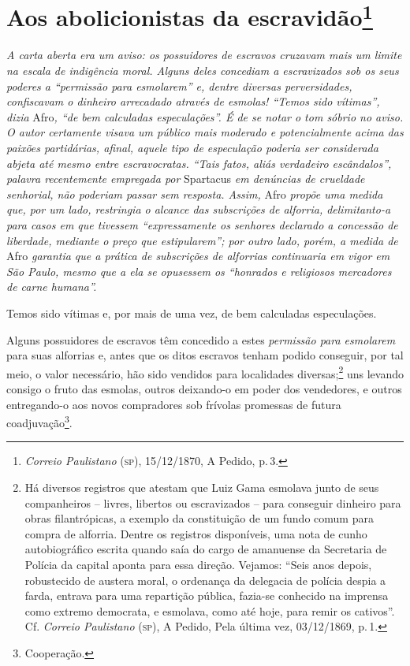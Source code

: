 \chapter{Aos abolicionistas da escravidão\footnote{\emph{Correio Paulistano} (\textsc{sp}), 15/12/1870, A Pedido,
  p.\,3.}} %

\begin{didascalia}
\emph{A carta aberta era um aviso: os possuidores de escravos cruzavam
mais um limite na escala de indigência moral. Alguns deles concediam a
escravizados sob os seus poderes a ``permissão para esmolarem'' e, dentre
diversas perversidades, confiscavam o dinheiro arrecadado através de
esmolas! ``Temos sido vítimas'', dizia} Afro\emph{, ``de bem calculadas
especulações''. É de se notar o tom sóbrio no aviso. O autor certamente
visava um público mais moderado e potencialmente acima das paixões
partidárias, afinal, aquele tipo de especulação poderia ser considerada
abjeta até mesmo entre escravocratas. ``Tais fatos, aliás verdadeiro
escândalos'', palavra recentemente empregada por} Spartacus \emph{em
denúncias de crueldade senhorial, não poderiam passar sem resposta.
Assim,} Afro \emph{propõe uma medida que, por um lado, restringia o
alcance das subscrições de alforria, delimitanto-a para casos em que
tivessem ``expressamente os senhores declarado a concessão de liberdade,
mediante o preço que estipularem''; por outro lado, porém, a medida de}
Afro \emph{garantia que a prática de subscrições de alforrias
continuaria em vigor em São Paulo, mesmo que a ela se opusessem os
``honrados e religiosos mercadores de carne humana''.}
\end{didascalia}


Temos sido vítimas e, por mais de uma vez, de bem calculadas
especulações.

Alguns possuidores de escravos têm concedido a estes \emph{permissão
para esmolarem} para suas alforrias e, antes que os ditos escravos
tenham podido conseguir, por tal meio, o valor necessário, hão sido
vendidos para localidades diversas;\footnote{ Há diversos registros que
  atestam que Luiz Gama esmolava junto de seus companheiros -- livres,
  libertos ou escravizados -- para conseguir dinheiro para obras
  filantrópicas, a exemplo da constituição de um fundo comum para compra
  de alforria. Dentre os registros disponíveis, uma nota de cunho
  autobiográfico escrita quando saía do cargo de amanuense da Secretaria
  de Polícia da capital aponta para essa direção. Vejamos: ``Seis anos
  depois, robustecido de austera moral, o ordenança da delegacia de
  polícia despia a farda, entrava para uma repartição pública, fazia-se
  conhecido na imprensa como extremo democrata, e esmolava, como até
  hoje, para remir os cativos''. Cf. \emph{Correio Paulistano} (\textsc{sp}), A
  Pedido, Pela última vez, 03/12/1869, p.\,1.} uns levando consigo o
fruto das esmolas, outros deixando-o em poder dos vendedores, e outros
entregando-o aos novos compradores sob frívolas promessas de futura
coadjuvação\footnote{ Cooperação.}.

